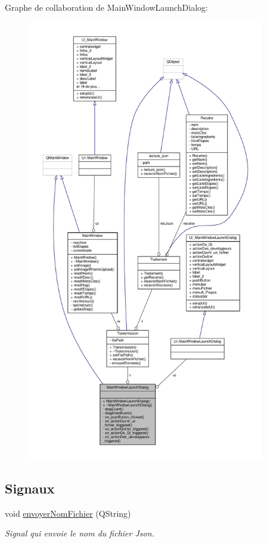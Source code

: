 Graphe de collaboration de Main\+Window\+Launch\+Dialog\+:\nopagebreak
\begin{figure}[H]
\begin{center}
\leavevmode
\includegraphics[height=550pt]{classMainWindowLaunchDialog__coll__graph}
\end{center}
\end{figure}
\subsection*{Signaux}
\begin{DoxyCompactItemize}
\item 
void \hyperlink{classMainWindowLaunchDialog_ab439c55ab98e6b1634de4fe64243ce48}{envoyer\+Nom\+Fichier} (Q\+String)
\begin{DoxyCompactList}\small\item\em Signal qui envoie le nom du fichier Json. \end{DoxyCompactList}\end{DoxyCompactItemize}
